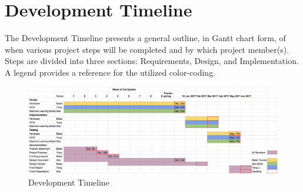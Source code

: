 \chapter{Development Timeline}
The Development Timeline presents a general outline, in Gantt chart form, of when various project steps will be completed and by which project member(s). Steps are divided into three sections: Requirements, Design, and Implementation. A legend provides a reference for the utilized color-coding.
\begin{figure}
	\label{fig:developmentTimeline}
	\centering
	\includegraphics[angle = 90, scale = 0.8]{developmentTimeline.png}
    
    \caption{Development Timeline}
\end{figure}